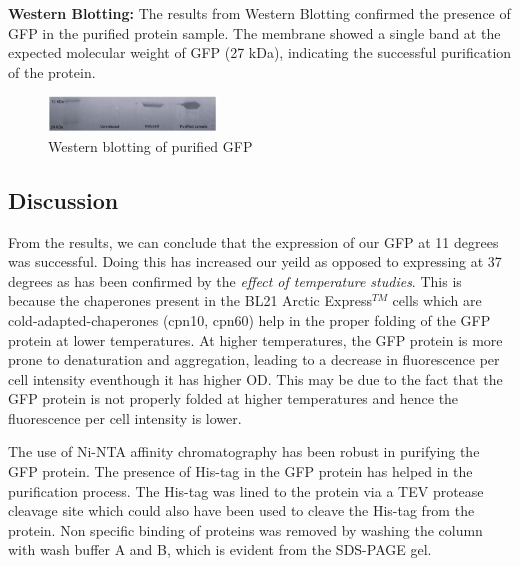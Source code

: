 \documentclass[twoside]{article}
\begin{document}
\begin{multicols}{2}

\textbf{Western Blotting:}
The results from Western Blotting confirmed the presence of GFP in the purified protein sample.
The membrane showed a single band at the expected molecular weight of GFP (27 kDa), indicating the successful purification of the protein.

\begin{figure}[H]
    \centering
    \includegraphics[width=0.4\textwidth]{Westernblot.jpg}
    \caption{Western blotting of purified GFP}
    \label{fig:Western_blot_image}
\end{figure}

\subsection*{Discussion}
From the results, we can conclude that the expression of our GFP at 11 degrees was successful. 
Doing this has increased our yeild as opposed to expressing at 37 degrees as has been confirmed by the \textit{effect of temperature studies}.
This is because the chaperones present in the BL21 Arctic Express$^{TM}$ cells which are cold-adapted-chaperones (cpn10, cpn60) help in the proper folding of the GFP protein at lower temperatures.
At higher temperatures, the GFP protein is more prone to denaturation and aggregation, leading to a decrease in fluorescence per cell intensity 
eventhough it has higher OD. This may be due to the fact that the GFP protein is not properly folded at higher temperatures and hence the fluorescence per cell intensity is lower.

The use of Ni-NTA affinity chromatography has been robust in purifying the GFP protein.
The presence of His-tag in the GFP protein has helped in the purification process.
The His-tag was lined to the protein via a TEV protease cleavage site which could also have been used to cleave the His-tag from the protein.
Non specific binding of proteins was removed by washing the column with wash buffer A and B, which is evident from the SDS-PAGE gel.


\end{multicols}
\end{document}
